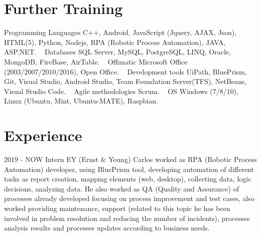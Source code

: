 \documentclass[]{friggeri-cv}
\begin{document}
\section{Further Training}
\begin{entrylist}
    \entry
    {}
    {Programming Languages}
    {}
    {C++, Android, JavaScript (Jquery, AJAX, Json), HTML(5), Python, Nodejs, RPA (Robotic Process Automation), JAVA, ASP.NET.}
    ~
    \entry
    {}
    {Databases}
    {}
    {SQL Server, MySQL, PostgreSQL, LINQ, Oracle, MongoDB, FireBase, AirTable.}
    ~
    \entry
    {}
    {Offimatic}
    {}
    {Microsoft Office (2003/2007/2010/2016), Open Office.}
    ~
    \entry
    {}
    {Development tools}
    {}
    {UiPath, BluePrism, Git, Visual Studio, Android Studio, Team Foundation Server(TFS), NetBeans, Visual Studio Code.}
    ~
    \entry
    {}
    {Agile methodologies}
    {}
    {Scrum.}
    ~
    \entry
    {}
    {OS}
    {}
    {Windows (7/8/10), Linux (Ubuntu, Mint, Ubuntu-MATE), Raspbian.}
    
\end{entrylist}

\section{Experience}
\begin{entrylist}
    \entry
    {2019 - NOW}
    {Intern}
    {EY (Ernst \& Young)}
    {Carlos worked as RPA (Robotic Process Automation) developer, using BluePrism tool, developing automation of different tasks as report creation, mapping elements (web, desktop), collecting data, logic decisions, analyzing data. He also worked as QA (Quality and Assurance) of processes already developed focusing on process improvement and test cases, also worked providing maintenance, support (related to this topic he has been involved in problem resolution and reducing the number of incidents), processes analysis results and processes updates according to business needs. }
    
    
\end{entrylist}
\end{document}
